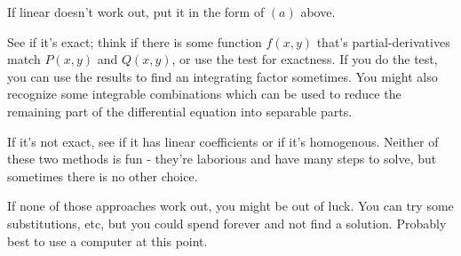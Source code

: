 \documentclass{article}
\begin{document}
If linear doesn't work out, put it in the form of $(a)$ above.

See if it's exact; think if there is some function $f(x,y)$ that's \@{partial-derivatives} match $P(x,y)$ and $Q(x,y)$, or use the test for exactness. If you do the test, you can use the results to find an integrating factor sometimes. You might also recognize some integrable combinations which can be used to reduce the remaining part of the differential equation into separable parts.

If it's not exact, see if it has linear coefficients or if it's homogenous. Neither of these two methods is fun - they're laborious and have many steps to solve, but sometimes there is no other choice.

If none of those approaches work out, you might be out of luck. You can try some substitutions, etc, but you could spend forever and not find a solution. Probably best to use a computer at this point.
\end{document}
